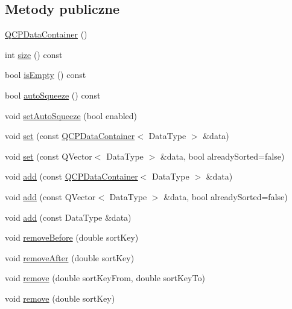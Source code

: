 \subsection*{Metody publiczne}
\begin{DoxyCompactItemize}
\item 
\hyperlink{class_q_c_p_data_container_af86c0c63719f92c360ff67cc06c6fe6f}{Q\+C\+P\+Data\+Container} ()
\item 
int \hyperlink{class_q_c_p_data_container_a09003591d8812dea7a548c500b62750a}{size} () const 
\item 
bool \hyperlink{class_q_c_p_data_container_af2a4d189394da4a3e78bf52ff6945f1d}{is\+Empty} () const 
\item 
bool \hyperlink{class_q_c_p_data_container_a998f6e133f162f32818ca529a0be7355}{auto\+Squeeze} () const 
\item 
void \hyperlink{class_q_c_p_data_container_a233f866760a78950d2a393c1a4bc54b5}{set\+Auto\+Squeeze} (bool enabled)
\item 
void \hyperlink{class_q_c_p_data_container_ae7042bd534fc3ce7befa2ce3f790b5bf}{set} (const \hyperlink{class_q_c_p_data_container}{Q\+C\+P\+Data\+Container}$<$ Data\+Type $>$ \&data)
\item 
void \hyperlink{class_q_c_p_data_container_aff99fffbb26597a354c4bc8312596ab2}{set} (const Q\+Vector$<$ Data\+Type $>$ \&data, bool already\+Sorted=false)
\item 
void \hyperlink{class_q_c_p_data_container_a42b98bd994307ccd163a43d576f91ad9}{add} (const \hyperlink{class_q_c_p_data_container}{Q\+C\+P\+Data\+Container}$<$ Data\+Type $>$ \&data)
\item 
void \hyperlink{class_q_c_p_data_container_a51d2a4c9ce4baf5e950b767d26673972}{add} (const Q\+Vector$<$ Data\+Type $>$ \&data, bool already\+Sorted=false)
\item 
void \hyperlink{class_q_c_p_data_container_a715e8e9972466804954a2f8fbd5288b7}{add} (const Data\+Type \&data)
\item 
void \hyperlink{class_q_c_p_data_container_aa7f74cbce304b0369e1626c3798e1eda}{remove\+Before} (double sort\+Key)
\item 
void \hyperlink{class_q_c_p_data_container_abbe5d87ffc10b5aeffa5bb42cf03aa3c}{remove\+After} (double sort\+Key)
\item 
void \hyperlink{class_q_c_p_data_container_ae5f569a120648b167efa78835f12fd38}{remove} (double sort\+Key\+From, double sort\+Key\+To)
\item 
void \hyperlink{class_q_c_p_data_container_a2dbded7f0732bacf9db48fdfbbb620bc}{remove} (double sort\+Key)

\end{DoxyCompactItemize}
